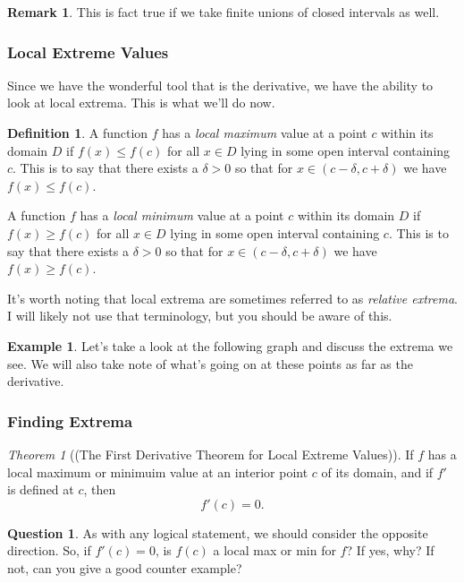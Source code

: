 \documentclass[leqno]{article}
\theoremstyle{definition}
\newtheorem{definition}{Definition}[section]
\newtheorem{remark}{Remark}[section]
\newtheorem{example}{Example}[section]
\newtheorem{question}{Question}[section]
\theoremstyle{remark}
\theoremstyle{theorem}
\newtheorem{theorem}{Theorem}[section]
\begin{document}
\begin{remark}
This is fact true if we take finite unions of closed intervals as well.
\end{remark}

\subsubsection{Local Extreme Values}

Since we have the wonderful tool that is the derivative, we have the ability to look at local extrema.  This is what we'll do now.

\begin{definition}
A function $f$ has a \emph{local maximum} value at a point $c$ within its domain $D$ if $f(x)\leq f(c)$ for all $x\in D$ lying in some open interval containing $c$.  This is to say that there exists a $\delta>0$ so that for $x\in (c-\delta, c+\delta)$ we have $f(x)\leq f(c)$.

A function $f$ has a \emph{local minimum} value at a point $c$ within its domain $D$ if $f(x)\geq f(c)$ for all $x\in D$ lying in some open interval containing $c$. This is to say that there exists a $\delta>0$ so that for $x\in (c-\delta, c+\delta)$ we have $f(x)\geq f(c)$.
\end{definition}

It's worth noting that local extrema are sometimes referred to as \emph{relative extrema}. I will likely not use that terminology, but you should be aware of this.

\begin{example}
Let's take a look at the following graph and discuss the extrema we see.  We will also take note of what's going on at these points as far as the derivative.
\vspace*{6cm}\\
\end{example}

\subsubsection{Finding Extrema}

\begin{theorem}[(The First Derivative Theorem for Local Extreme Values)]
If $f$ has a local maximum or minimuim value at an interior point $c$ of its domain, and if $f'$ is defined at $c$, then
\[
f'(c)=0.
\]
\end{theorem}

\begin{question}
As with any logical statement, we should consider the opposite direction.  So, if $f'(c)=0$, is $f(c)$ a local max or min for $f$? If yes, why? If not, can you give a good counter example?
\vspace*{3cm}\\
\end{question}
\end{document}
